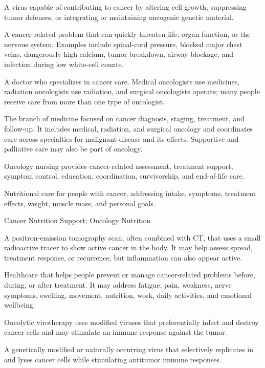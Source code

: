  A virus capable of contributing to cancer by altering cell growth, suppressing tumor defenses, or integrating or maintaining oncogenic genetic material.

 A cancer-related problem that can quickly threaten life, organ function, or the nervous system. Examples include spinal-cord pressure, blocked major chest veins, dangerously high calcium, tumor breakdown, airway blockage, and infection during low white-cell counts.

 A doctor who specializes in cancer care. Medical oncologists use medicines, radiation oncologists use radiation, and surgical oncologists operate; many people receive care from more than one type of oncologist.

 The branch of medicine focused on cancer diagnosis, staging, treatment, and follow-up.
It includes medical, radiation, and surgical oncology and coordinates care across specialties
for malignant disease and its effects. Supportive and palliative care may also be part
of oncology.

 Oncology nursing provides cancer-related assessment, treatment support, symptom control, education, coordination, survivorship, and end-of-life care.

 Nutritional care for people with cancer, addressing intake, symptoms, treatment effects, weight, muscle mass, and personal goals.

\synonyms
Cancer Nutrition Support; Oncology Nutrition

 A positron-emission tomography scan, often combined with CT, that uses a small radioactive tracer to show active cancer in the body. It may help assess spread, treatment response, or recurrence, but inflammation can also appear active.

 Healthcare that helps people prevent or manage cancer-related problems before, during, or after treatment. It may address fatigue, pain, weakness, nerve symptoms, swelling, movement, nutrition, work, daily activities, and emotional wellbeing.

 Oncolytic virotherapy uses modified viruses that preferentially infect and destroy cancer cells and may stimulate an immune response against the tumor.

 A genetically modified or naturally occurring virus that selectively replicates in and lyses cancer cells while stimulating antitumor immune responses.

